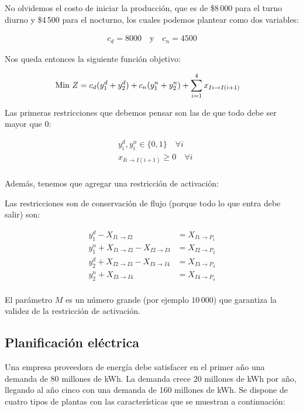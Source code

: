 \documentclass[12pt]{article}
\begin{document}
No olvidemos el costo de iniciar la producción, que es de \$8\,000 para el turno diurno y \$4\,500 para el nocturno, los cuales podemos plantear como dos variables:

\begin{align*}
    c_d = 8000 \quad \text{y} \quad c_n = 4500
\end{align*}

Nos queda entonces la siguiente función objetivo:

\begin{align*}
    \text{Min } & Z = c_d\*(y^d_1 + y^d_2) + c_n\*(y^n_1 + y^n_2) + \sum_{i=1}^{4} x_{Ii \to I(i+1)}
\end{align*}

Las primeras restricciones que debemos pensar son las de que todo debe ser mayor que 0:

\begin{align*}
    &y^d_i, y^n_i \in \{0,1\} \quad \forall i \\
    &x_{Ii \to I(i+1)} \ge 0 \quad \forall i \\
\end{align*}

Además, tenemos que agregar una restricción de activación:

Las restricciones son de conservación de flujo (porque todo lo que entra debe salir) son:

\begin{align*}
    y^d_1 - X_{I1 \to I2} &= X_{I1 \to P_1} \\
    y^n_1 + X_{I1 \to I2} - X_{I2 \to I3} &= X_{I2 \to P_2} \\
    y^d_2 + X_{I2 \to I3} - X_{I3 \to I4} &= X_{I3 \to P_3} \\
    y^n_2 + X_{I3 \to I4} &= X_{I4 \to P_4} \\
\end{align*}

El parámetro $M$ es un número grande (por ejemplo $10\,000$) que garantiza la validez de la restricción de activación.


\subsection{Planificación eléctrica}
Una empresa proveedora de energía debe satisfacer en el primer año una demanda de 80 millones de kWh. La demanda crece 20 millones de kWh por año, llegando al año cinco con una demanda de 160 millones de kWh. Se dispone de cuatro tipos de plantas con las características que se muestran a continuación:
\end{document}
